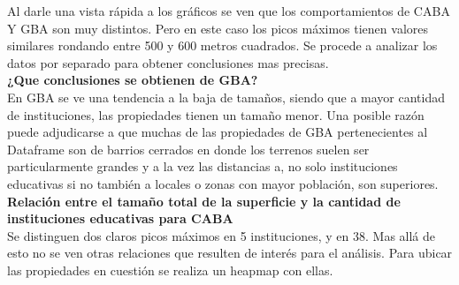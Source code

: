 \documentclass[a4paper, 10pt]{article}
\begin{document}
				
				Al darle una vista rápida a los gráficos se  ven que los comportamientos de 
				CABA Y GBA son muy distintos. Pero en este caso los picos máximos tienen 
				valores similares rondando entre 500 y 600 metros cuadrados. 
				Se procede a analizar los datos por separado para obtener conclusiones mas precisas.\\
				
				\textbf{¿Que conclusiones se obtienen de GBA?}\\
				En GBA se ve una tendencia a la baja de tamaños, siendo que a mayor 
				cantidad de instituciones, las propiedades tienen un tamaño menor. 
				Una posible razón puede adjudicarse a que muchas de las propiedades 
				de GBA pertenecientes al Dataframe son de barrios cerrados en donde 
				los terrenos suelen ser particularmente grandes y a la vez las 
				distancias a, no solo instituciones educativas si no también a 
				locales o zonas con mayor población, son superiores.\\
				
				\textbf{Relación entre el tamaño total de la superficie y la cantidad de 
				instituciones educativas para CABA}\\
				Se distinguen dos claros picos máximos en 5 instituciones, y en 38. 
				Mas allá de esto no se ven otras relaciones que resulten de interés 
				para el análisis. Para ubicar las propiedades en cuestión se realiza 
				un heapmap con ellas.
					
\end{document}
